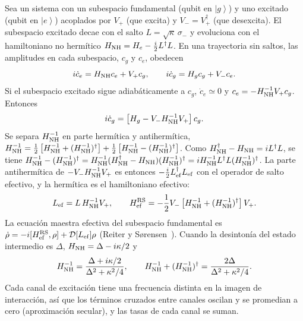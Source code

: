 \documentclass[11pt,a4paper]{article}
\newcommand{\ket}[1]{\left|#1\right\rangle}
\newcommand{\smi}{\sigma_{-}}
\newcommand{\D}{\mathcal{D}}
\newcommand{\Href}{H_{\mathrm{ef}}}
\theoremstyle{definition}
\begin{document}
Sea un sistema con un subespacio fundamental (qubit en $\ket{g}$) y uno excitado (qubit en $\ket{e}$) acoplados por $V_+$ (que excita) y $V_-=V_+^{\dagger}$ (que desexcita). El subespacio excitado decae con el salto $L=\sqrt\kappa\,\smi$ y evoluciona con el hamiltoniano no hermítico $H_{\rm NH}=H_e-\tfrac{i}{2}L^{\dagger}L$. En una trayectoria sin saltos, las amplitudes en cada subespacio, $c_g$ y $c_e$, obedecen
\begin{equation}
i\dot c_e=H_{\rm NH}c_e+V_+c_g,\qquad i\dot c_g=H_gc_g+V_-c_e.
\end{equation}
Si el subespacio excitado sigue adiabáticamente a $c_g$, $\dot c_e\simeq0$ y $c_e=-H_{\rm NH}^{-1}V_+c_g$. Entonces
\begin{equation}
i\dot c_g=\left[H_g-V_-H_{\rm NH}^{-1}V_+\right]c_g.
\end{equation}
Se separa $H_{\rm NH}^{-1}$ en parte hermítica y antihermítica, $H_{\rm NH}^{-1}=\tfrac12\left[H_{\rm NH}^{-1}+(H_{\rm NH}^{-1})^{\dagger}\right]+\tfrac12\left[H_{\rm NH}^{-1}-(H_{\rm NH}^{-1})^{\dagger}\right]$. Como $H_{\rm NH}^{\dagger}-H_{\rm NH}=iL^{\dagger}L$, se tiene $H_{\rm NH}^{-1}-(H_{\rm NH}^{-1})^{\dagger}=H_{\rm NH}^{-1}(H_{\rm NH}^{\dagger}-H_{\rm NH})(H_{\rm NH}^{-1})^{\dagger}=iH_{\rm NH}^{-1}L^{\dagger}L(H_{\rm NH}^{-1})^{\dagger}$. La parte antihermítica de $-V_-H_{\rm NH}^{-1}V_+$ es entonces $-\tfrac{i}{2}L_{\rm ef}^{\dagger}L_{\rm ef}$ con el operador de salto efectivo, y la hermítica es el hamiltoniano efectivo:
\begin{equation}
L_{\rm ef}=L\,H_{\rm NH}^{-1}V_+,\qquad \Href^{\rm RS}=-\frac12V_-\left[H_{\rm NH}^{-1}+(H_{\rm NH}^{-1})^{\dagger}\right]V_+.
\label{eq:RS}
\end{equation}
La ecuación maestra efectiva del subespacio fundamental es $\dot\rho=-i[\Href^{\rm RS},\rho]+\D[L_{\rm ef}]\rho$ (Reiter y Sørensen~\cite{ReiterSorensen2012}). Cuando la desintonía del estado intermedio es $\Delta$, $H_{\rm NH}=\Delta-i\kappa/2$ y
\begin{equation}
H_{\rm NH}^{-1}=\frac{\Delta+i\kappa/2}{\Delta^2+\kappa^2/4},\qquad H_{\rm NH}^{-1}+(H_{\rm NH}^{-1})^{\dagger}=\frac{2\Delta}{\Delta^2+\kappa^2/4}.
\label{eq:HNHinv}
\end{equation}
Cada canal de excitación tiene una frecuencia distinta en la imagen de interacción, así que los términos cruzados entre canales oscilan y se promedian a cero (aproximación secular), y las tasas de cada canal se suman.
\end{document}
